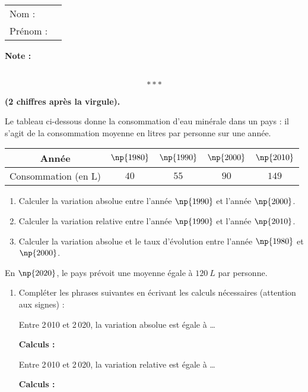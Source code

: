 \documentclass[10pt,french]{article}
\newcommand\competences{
\setcounter{exo}{0}
\begin{tabular}{ll} Nom : \\[5pt] Prénom : \end{tabular}
\hfill
\textbf{Note :}\renewcommand\arraystretch{2.3}
\begin{tabularx}{0.17\linewidth}{|X|}
\hline
\slashbox{\Huge\bfseries\phantom{10}}{\Huge\bfseries 10}\\
\hline
\end{tabularx}\renewcommand\arraystretch{1}
\[***\]
}
\begin{document}
\clearpage


\competences

\textbf{ (2 chiffres après la virgule).}\bigskip

Le tableau ci-dessous donne la consommation d'eau minérale dans un pays : il s'agit de la consommation moyenne en litres par personne sur une année.

\begin{center}
\renewcommand\arraystretch{1.5}
    \begin{tabular}{*{5}{|c}|}
    \hline
        Année & $\np{1980}$ & $\np{1990}$ & $\np{2000}$ & $\np{2010}$ \\
    \hline
        Consommation (en L) & $40$ & $55$ & $90$ & $149$ \\
    \hline
    \end{tabular}
\renewcommand\arraystretch{1}
\end{center}\medskip

\begin{enumerate}
    \item Calculer la variation absolue entre l'année $\np{1990}$ et l'année $\np{2000}$.\vspace{2cm}
    \item Calculer la variation relative entre l'année $\np{1990}$ et l'année $\np{2010}$.\vspace{2cm}
    \item Calculer la variation absolue et le taux d'évolution entre l'année $\np{1980}$ et $\np{2000}$.\vspace{2cm}
\end{enumerate}

En $\np{2020}$, le pays prévoit une moyenne égale à $120~L$ par personne.

\begin{enumerate}[resume]
    \item Compléter les phrases suivantes en écrivant les calculs nécessaires (attention aux signes) :\par
    {\cursive Entre 2\,010 et 2\,020, la variation absolue est égale à \ldots} \par\medskip
    \textbf{Calculs :}\vspace{2cm}

    {\cursive Entre 2\,010 et 2\,020, la variation relative est égale à \ldots \par\medskip}
    \textbf{Calculs :}\vspace{2cm}
\end{enumerate}
\end{document}
